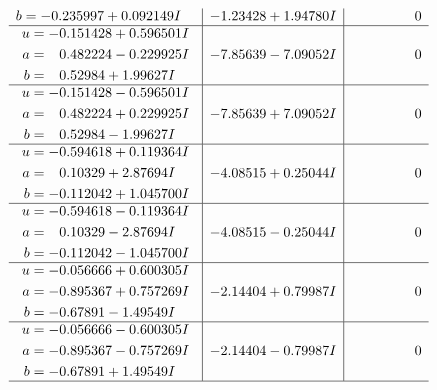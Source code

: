\documentclass[1p]{elsarticle_modified}
\theoremstyle{definition}
\begin{document}
$$\begin{array}{c|c|c}
\begin{aligned}
b &= -0.235997 + 0.092149 I\end{aligned}
 & -1.23428 + 1.94780 I & \phantom{-0.000000 } 0 \\ \hline\begin{aligned}
u &= -0.151428 + 0.596501 I \\
a &= \phantom{-}0.482224 - 0.229925 I \\
b &= \phantom{-}0.52984 + 1.99627 I\end{aligned}
 & -7.85639 - 7.09052 I & \phantom{-0.000000 } 0 \\ \hline\begin{aligned}
u &= -0.151428 - 0.596501 I \\
a &= \phantom{-}0.482224 + 0.229925 I \\
b &= \phantom{-}0.52984 - 1.99627 I\end{aligned}
 & -7.85639 + 7.09052 I & \phantom{-0.000000 } 0 \\ \hline\begin{aligned}
u &= -0.594618 + 0.119364 I \\
a &= \phantom{-}0.10329 + 2.87694 I \\
b &= -0.112042 + 1.045700 I\end{aligned}
 & -4.08515 + 0.25044 I & \phantom{-0.000000 } 0 \\ \hline\begin{aligned}
u &= -0.594618 - 0.119364 I \\
a &= \phantom{-}0.10329 - 2.87694 I \\
b &= -0.112042 - 1.045700 I\end{aligned}
 & -4.08515 - 0.25044 I & \phantom{-0.000000 } 0 \\ \hline\begin{aligned}
u &= -0.056666 + 0.600305 I \\
a &= -0.895367 + 0.757269 I \\
b &= -0.67891 - 1.49549 I\end{aligned}
 & -2.14404 + 0.79987 I & \phantom{-0.000000 } 0 \\ \hline\begin{aligned}
u &= -0.056666 - 0.600305 I \\
a &= -0.895367 - 0.757269 I \\
b &= -0.67891 + 1.49549 I\end{aligned}
 & -2.14404 - 0.79987 I & \phantom{-0.000000 } 0\\
 \hline 
 \end{array}$$\newpage$$\begin{array}{c|c|c}  

\end{array}$$
\end{document}

